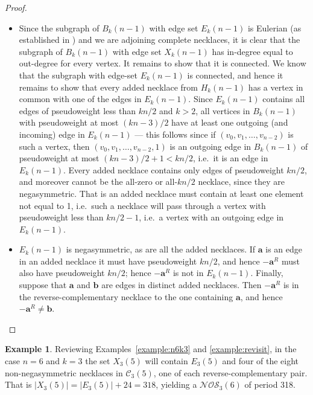 \documentclass[a4paper,11pt]{article}
\theoremstyle{plain}
\theoremstyle{definition}
\newtheorem{example}{Example}[section]
\theoremstyle{remark}
\begin{document}
\begin{proof}
\begin{itemize}
\item[(i)] Since the subgraph of $B_k(n-1)$ with edge set $E_k(n-1)$ is Eulerian (as
    established in \cite[Section 3.3]{Mitchell25a}) and we are adjoining complete necklaces, it
    is clear that the subgraph of $B_k(n-1)$ with edge set $X_k(n-1)$ has in-degree equal to
    out-degree for every vertex. It remains to show that it is connected. We know that the
    subgraph with edge-set $E_k(n-1)$ is connected, and hence it remains to show that every
    added necklace from $H_k(n-1)$ has a vertex in common with one of the edges in $E_k(n-1)$.
    Since $E_k(n-1)$ contains all edges of pseudoweight less than $kn/2$ and $k>2$, all
    vertices in $B_k(n-1)$ with pseudoweight at most $(kn-3)/2$ have at least one outgoing (and
    incoming) edge in $E_k(n-1)$ --- this follows since if $(v_0,v_1,\dots,v_{n-2})$ is such a
    vertex, then $(v_0,v_1,\dots,v_{n-2},1)$ is an outgoing edge in $B_k(n-1)$ of pseudoweight
    at most $(kn-3)/2+1<kn/2$, i.e.\ it is an edge in $E_k(n-1)$. Every added necklace contains
    only edges of pseudoweight $kn/2$, and moreover cannot be the all-zero or all-$kn/2$
    necklace, since they are negasymmetric. That is an added necklace must contain at least one
    element not equal to 1, i.e.\ such a necklace will pass through a vertex with pseudoweight
    less than $kn/2-1$, i.e.\ a vertex with an outgoing edge in $E_k(n-1)$.
\item[(ii)] $E_k(n-1)$ is negasymmetric, as are all the added necklaces.  If $\mathbf{a}$ is an
    edge in an added necklace it must have pseudoweight $kn/2$, and hence $-\mathbf{a}^R$ must
    also have pseudoweight $kn/2$; hence $-\mathbf{a}^R$ is not in $E_k(n-1)$.  Finally,
    suppose that $\mathbf{a}$ and $\mathbf{b}$ are edges in distinct added necklaces.  Then
    $-\mathbf{a}^R$ is in the reverse-complementary necklace to the one containing
    $\mathbf{a}$, and hence $-\mathbf{a}^R\neq\mathbf{b}$.
\end{itemize}
\end{proof}

\begin{example} Reviewing Examples~\ref{example:n6k3} and \ref{example:revisit}, in
the case $n=6$ and $k=3$ the set $X_3(5)$ will contain $E_3(5)$ and four of the eight
non-negasymmetric necklaces in $\mathcal{C}_3(5)$, one of each reverse-complementary pair.  That is
$|X_3(5)|=|E_3(5)|+24=318$, yielding a $\mathcal{NOS}_3(6)$ of period 318.
\end{example}
\end{document}
